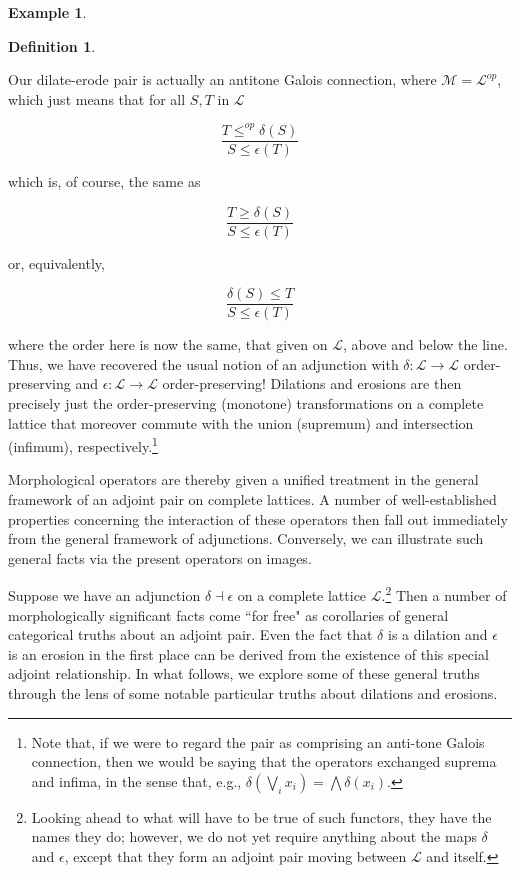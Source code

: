 \documentclass[11pt]{book}
\theoremstyle{definition}
\newtheorem{example}{Example}[section]
\theoremstyle{definition}
\newtheorem{definition}{Definition}[section]
\theoremstyle{definition}
\theoremstyle{theorem}
\theoremstyle{definition}
\begin{document}
\begin{example}
\begin{definition}
	\end{definition} 
Our dilate-erode pair is actually an antitone Galois connection, where $\mathcal{M} = \mathcal{L}^{op}$, which just means that for all $S, T$ in $\mathcal{L}$ 
\begin{center} 
	\begin{equation*}
	\frac{T \leq^{op} \delta(S)}{S \leq \epsilon(T)}
	\end{equation*}
\end{center}   
which is, of course, the same as 
\begin{center} 
	\begin{equation*}
	\frac{T \geq \delta(S)}{S \leq \epsilon(T)}
	\end{equation*}
\end{center}    
or, equivalently, 
\begin{center} 
	\begin{equation*}
	\frac{\delta(S) \leq T}{S \leq \epsilon(T)}
	\end{equation*}
\end{center}    
where the order here is now the same, that given on $\mathcal{L}$, above and below the line. Thus, we have recovered the usual notion of an adjunction with $\delta: \mathcal{L} \rightarrow \mathcal{L}$ order-preserving and $\epsilon: \mathcal{L} \rightarrow \mathcal{L}$ order-preserving! Dilations and erosions are then precisely just the order-preserving (monotone) transformations on a complete lattice that moreover commute with the union (supremum) and intersection (infimum), respectively.\footnote{Note that, if we were to regard the pair as comprising an anti-tone Galois connection, then we would be saying that the operators exchanged suprema and infima, in the sense that, e.g., $\delta(\bigvee_i x_i) = \bigwedge \delta(x_i)$.} 
\par 
Morphological operators are thereby given a unified treatment in the general framework of an adjoint pair on complete lattices. A number of well-established properties concerning the interaction of these operators then fall out immediately from the general framework of adjunctions. Conversely, we can illustrate such general facts via the present operators on images. \par 
Suppose we have an adjunction $\delta \dashv \epsilon$ on a complete lattice $\mathcal{L}$.\footnote{Looking ahead to what will have to be true of such functors, they have the names they do; however, we do not yet require anything about the maps $\delta$ and $\epsilon$, except that they form an adjoint pair moving between $\mathcal{L}$ and itself.} Then a number of morphologically significant facts come ``for free" as corollaries of general categorical truths about an adjoint pair. Even the fact that $\delta$ is a dilation and $\epsilon$ is an erosion in the first place can be derived from the existence of this special adjoint relationship. In what follows, we explore some of these general truths through the lens of some notable particular truths about dilations and erosions.  

\end{example}
\end{document}
